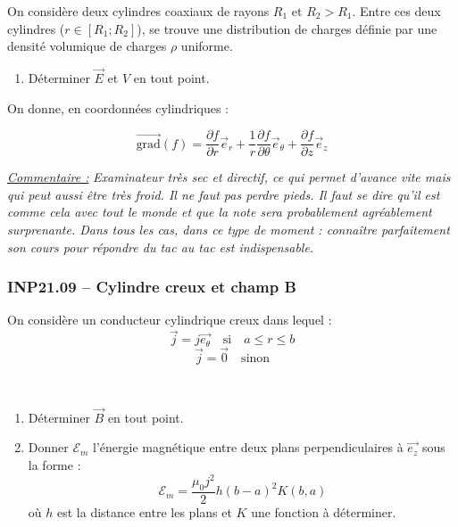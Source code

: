 On considère deux cylindres coaxiaux de rayons $R_1$ et $R_2 > R_1$. Entre ces deux cylindres ($r \in [R_1; R_2]$), se trouve une distribution de charges définie par une densité volumique de charges $\rho$ uniforme.

\begin{enumerate}
    \item Déterminer $\overrightarrow{E}$ et $V$ en tout point.
\end{enumerate}

On donne, en coordonnées cylindriques :

\[
\overrightarrow{\text{grad}}(f) = \frac{\partial f}{\partial r} \overrightarrow{e}_r + \frac{1}{r} \frac{\partial f}{\partial \theta} \overrightarrow{e}_\theta + \frac{\partial f}{\partial z} \overrightarrow{e}_z
\]

\textit{\underline{Commentaire :}}
\textit{\small{Examinateur très sec et directif, ce qui permet d’avance vite mais qui peut aussi être très froid. Il ne faut pas perdre pieds. Il faut se dire qu’il est comme cela avec tout le monde et que la note sera probablement agréablement surprenante. Dans tous les cas, dans ce type de moment : connaître parfaitement son cours pour répondre du tac au tac est indispensable.}}

\newpage
\subsubsection*{INP21.09 -- Cylindre creux et champ B  \corrige}

On considère un conducteur cylindrique creux dans lequel :
\[
\overrightarrow{j} = j \overrightarrow{e_\theta} \quad \text{si} \quad a \leq r \leq b
\]
\[
\overrightarrow{j} = \overrightarrow{0} \quad \text{sinon}
\]

\begin{minipage}[t]{0.45\textwidth} %
~
\vspace{0em}

\end{minipage}
\hfill %
\begin{minipage}[t]{0.5\textwidth} %


\begin{enumerate}
    \item Déterminer $\overrightarrow{B}$ en tout point.
    \item Donner $\mathcal{E}_m$ l'énergie magnétique entre deux plans perpendiculaires à $\overrightarrow{e_z}$ sous la forme :
    \[
    \mathcal{E}_m = \frac{\mu_0 j^2}{2} h (b - a)^2 K(b, a)
    \]
    où $h$ est la distance entre les plans et $K$ une fonction à déterminer.
\end{enumerate}

\end{minipage}



